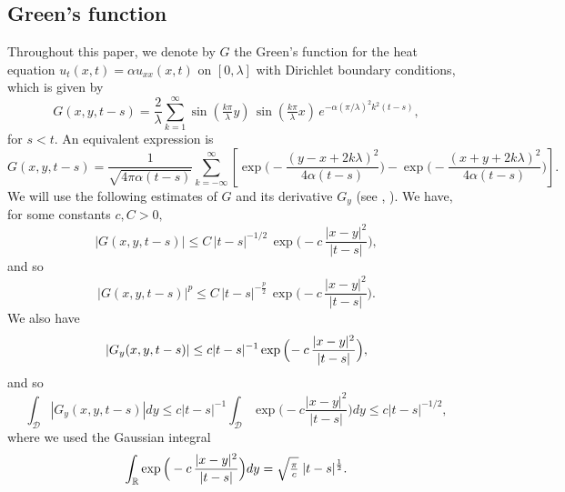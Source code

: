 \documentclass[reqno]{amsart}
\numberwithin{equation}{section}
\begin{document}
\subsection{Green's function} Throughout this paper, we denote by $G$ the Green's function for the heat equation $u_t(x,t)= \alpha u_{xx}(x,t)$ on $[0,\lambda] $ with Dirichlet boundary conditions, which is given by
\begin{equation}\label{kostasgreen1}
G(x,y,t-s) = \frac{2}{\lambda} \sum_{k=1}^\infty \sin(\tfrac{k\pi}{\lambda} y)\, \sin(\tfrac{k\pi}{\lambda} x)\, e^{-\alpha (\pi/\lambda)^2 k^2 (t-s)}  ,
\end{equation}
 for $s<t. $ An equivalent expression is
\begin{equation}\label{kostasgreen2}
G(x,y,t-s)=\frac{1}{\sqrt{4\pi\alpha(t-s)}}\sum_{k=-\infty}^\infty\left[\exp\Big(-\frac{(y-x+2k\lambda)^2}{4\alpha(t-s)}\Big)-\exp\Big(-\frac{(x+y+2k\lambda)^2}{4\alpha(t-s)}\Big)\right].
\end{equation}
We will use the following estimates of $ G $ and its derivative $G_y $ (see \cite{EidelIvas}, \cite{Solonnikov}). We have, for some constants $c,C>0, $
$$ |G(x,y,t-s)|\leq C\,|t-s|^{-1/2} \, \exp\Big(\!-c\,\frac{|x-y|^2}{|t-s|}\Big), $$
and so
\begin{equation}\label{ggg}
|G(x,y,t-s)|^p\leq
 C\,|t-s|^{-\frac{p}{2}}\,\exp\Big(\!-c\,\frac{|x-y|^{2}}{|t-s|}\Big).
\end{equation}
We also have
\begin{equation}\label{gen}
|G_y(x,y,t-s)|\leq
c|t-s|^{-1}\exp\Big{(}\!-c\,\frac{|x-y|^2}{|t-s|}\Big{)},
\end{equation}
and so
\begin{equation}\label{gy}
\int_{\mathcal{D}}|G_y(x,y,t-s)|dy\leq
c|t-s|^{-1}\int_{\mathcal{D}}\exp\Big(\!-c\frac{|x-y|^2}{|t-s|}\Big)dy\leq
c|t-s|^{-1/2} ,
\end{equation}
where we used the Gaussian integral
\begin{equation}\label{kostasgaus}
\int_{\mathbb{R}}\exp\Big{(}-c\,\frac{|x-y|^{2}}{|t-s|}\Big{)}dy = \sqrt{\tfrac{\pi}{c}}\; |t-s|^{\frac{1}{2}}.
\end{equation}
\end{document}
